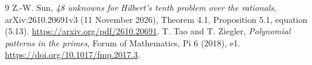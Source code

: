 \documentclass[11pt,a4paper]{article}
\begin{document}
\begin{thebibliography}{9}
Z.-W. Sun, \emph{48 unknowns for Hilbert's tenth problem
over the rationals}, arXiv:2610.20691v3 (11 November 2026),
Theorem 4.1, Proposition 5.1, equation (5.13).
\url{https://arxiv.org/pdf/2610.20691}.
T. Tao and T. Ziegler, \emph{Polynomial patterns in the
primes}, Forum of Mathematics, Pi 6 (2018), e1.
\url{https://doi.org/10.1017/fmp.2017.3}.
\end{thebibliography}
\end{document}
